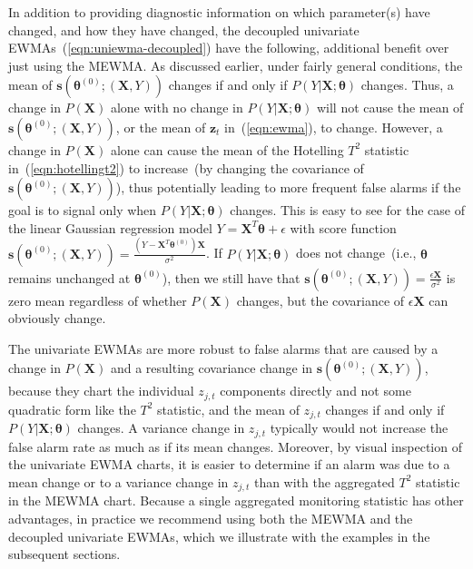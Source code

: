 \documentclass[twoside,11pt]{article}
\begin{document}
In addition to providing diagnostic information on which parameter(s) have changed, and how they have changed, the decoupled univariate EWMAs~(\ref{eqn:uniewma-decoupled}) have the following, additional benefit over just using the MEWMA. As discussed earlier, under fairly general conditions, the mean of $\bm{s}(\bm { \theta}^{ (0)}; (\bm {X}, Y))$ changes if and only if $P(Y|\bm{X};\bm{\theta})$ changes. Thus, a change in $P(\bm{X})$ alone with no change in $P(Y|\bm{X};\bm{\theta})$ will not cause the mean of $\bm{s}(\bm { \theta}^{ (0)}; (\bm {X}, Y))$, or the mean of $\bm{z}_t$ in~(\ref{eqn:ewma}), to change. However, a change in $P(\bm{X})$ alone can cause the mean of the Hotelling $T^2$ statistic in~(\ref{eqn:hotellingt2}) to increase~(by changing the covariance of $\bm{s}(\bm { \theta}^{ (0)}; (\bm {X}, Y))$), thus potentially leading to more frequent false alarms if the goal is to signal only when $P(Y|\bm{X};\bm{\theta})$ changes. This is easy to see for the case of the linear Gaussian regression model $Y = \bm{X}^T\bm{\theta} + \epsilon$ with score function $\bm{s}(\bm { \theta}^{ (0)}; (\bm {X}, Y)) = \frac{(Y - \bm{X}^T\bm{\theta}^{ (0)})\bm{X}}{\sigma^2}$. If $P(Y|\bm{X};\bm{\theta})$ does not change~(i.e., $\bm{\theta}$ remains unchanged at $\bm{\theta}^{ (0)}$), then we still have that $\bm{s}(\bm { \theta}^{ (0)}; (\bm {X}, Y)) = \frac{\epsilon \bm{X}}{\sigma^2}$ is zero mean regardless of whether $P(\bm{X})$ changes, but the covariance of $\epsilon \bm{X}$ can obviously change.   

The univariate EWMAs are more robust to false alarms that are caused by a change in $P(\bm{X})$ and a resulting covariance change in $\bm{s}(\bm { \theta}^{ (0)}; (\bm {X}, Y))$, because they chart the individual $z_{j,t}$ components directly and not some quadratic form like the $T^2$ statistic, and the mean of $z_{j,t}$ changes if and only if $P(Y|\bm{X};\bm{\theta})$ changes. A variance change in $z_{j,t}$ typically would not increase the false alarm rate as much as if its mean changes. Moreover, by visual inspection of the univariate EWMA charts, it is easier to determine if an alarm was due to a mean change or to a variance change in $z_{j,t}$ than with the aggregated $T^2$ statistic in the MEWMA chart.  Because a single aggregated monitoring statistic has other advantages, in practice we recommend using both the MEWMA and the decoupled univariate EWMAs, which we illustrate with the examples in the subsequent sections. 
\end{document}
